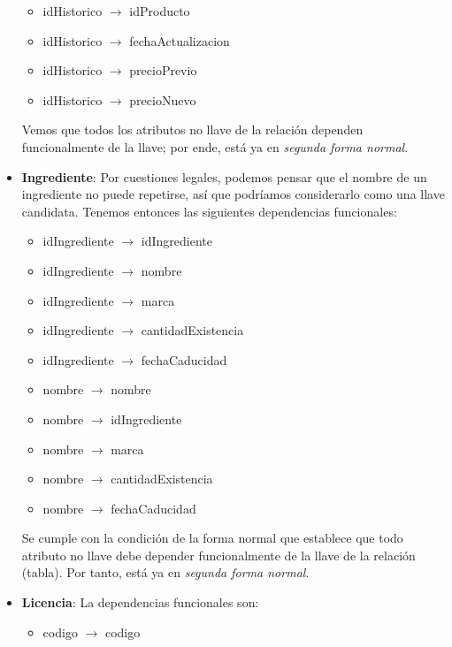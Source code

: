 \documentclass[11pt,letterpaper]{article}
\begin{document}
\begin{itemize}
\begin{itemize}
\item idHistorico $\rightarrow$ idProducto
\item idHistorico $\rightarrow$ fechaActualizacion
\item idHistorico $\rightarrow$ precioPrevio
\item idHistorico $\rightarrow$ precioNuevo
\end{itemize}

Vemos que todos los atributos no llave de la relación dependen funcionalmente de la llave; por ende, está ya en \textit{segunda forma normal}.  

\item \textbf{Ingrediente}: Por cuestiones legales, podemos pensar que el nombre de un ingrediente no puede repetirse, así que podríamos considerarlo como una llave candidata. Tenemos entonces las siguientes dependencias funcionales:

\begin{itemize}
\item idIngrediente $\rightarrow$ idIngrediente

\item idIngrediente $\rightarrow$ nombre
\item idIngrediente $\rightarrow$ marca
\item idIngrediente $\rightarrow$ cantidadExistencia
\item idIngrediente $\rightarrow$ fechaCaducidad


\item nombre $\rightarrow$ nombre

\item nombre $\rightarrow$ idIngrediente
\item nombre $\rightarrow$ marca
\item nombre $\rightarrow$ cantidadExistencia
\item nombre $\rightarrow$ fechaCaducidad
\end{itemize}

Se cumple con la condición de la forma normal que establece que todo atributo no llave debe depender funcionalmente de la llave de la relación (tabla). Por tanto, está ya en \textit{segunda forma normal}. 
\item \textbf{Licencia}: La dependencias funcionales son:

\begin{itemize}
\item codigo $\rightarrow$ codigo


\end{itemize}
\end{itemize}
\end{document}
